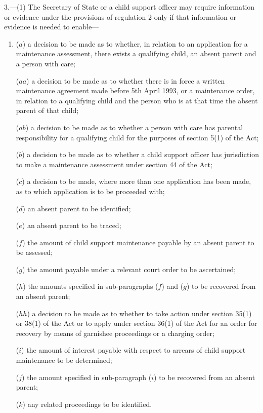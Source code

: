 \documentclass[a4paper]{article}
\begin{document}
3.—(1) The Secretary of State 
or a child support officer  %
may require information or evidence under the provisions of regulation 2 only if that information or evidence is needed to enable—
\begin{enumerate}\item[]
($a$) a decision to be made as to whether, in relation to an application for a maintenance assessment, there exists a qualifying child, an absent parent and a person with care;

($aa$) a decision to be made as to whether there is in force a written maintenance agreement made before 5th April 1993, or a maintenance order, in relation to a qualifying child and the person who is at that time the absent parent of that child;

($ab$) a decision to be made as to whether a person with care has parental responsibility for a qualifying child for the purposes of section 5(1) of the Act;

($b$) a decision to be made as to whether a child support officer has jurisdiction to make a maintenance assessment under section 44 of the Act;

($c$) a decision to be made, where more than one application has been made, as to which application is to be proceeded with;

($d$) an absent parent to be identified;

($e$) an absent parent to be traced;

($f$) the amount of child support maintenance payable by an absent parent to be assessed;

($g$) the amount payable under a relevant court order to be ascertained;

($h$) the amounts specified in sub-paragraphs ($f$) and ($g$) to be recovered from an absent parent;

($hh$) a decision to be made as to whether to take action under section 35(1) or 38(1) of the Act or to apply under section 36(1) of the Act for an order for recovery by means of garnishee proceedings or a charging order;

($i$) the amount of interest payable with respect to arrears of child support maintenance to be determined;

($j$) the amount specified in sub-paragraph ($i$) to be recovered from an absent parent;

($k$) any related proceedings to be identified.
\end{enumerate}
\end{document}
